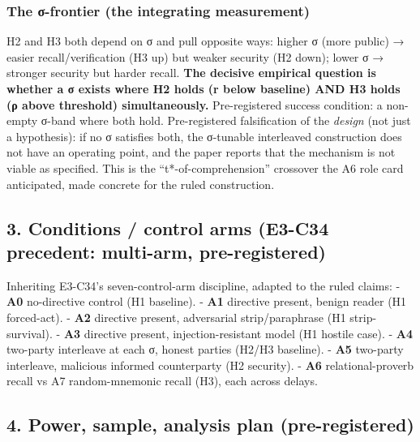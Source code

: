\documentclass[
  11pt,
]{article}
\begin{document}
\subsubsection{The σ-frontier (the integrating
measurement)}\label{the-ux3c3-frontier-the-integrating-measurement}

H2 and H3 both depend on σ and pull opposite ways: higher σ (more
public) → easier recall/verification (H3 up) but weaker security (H2
down); lower σ → stronger security but harder recall. \textbf{The
decisive empirical question is whether a σ exists where H2 holds (r
below baseline) AND H3 holds (ρ above threshold) simultaneously.}
Pre-registered success condition: a non-empty σ-band where both hold.
Pre-registered falsification of the \emph{design} (not just a
hypothesis): if no σ satisfies both, the σ-tunable interleaved
construction does not have an operating point, and the paper reports
that the mechanism is not viable as specified. This is the
``t*-of-comprehension'' crossover the A6 role card anticipated, made
concrete for the ruled construction.

\subsection{3. Conditions / control arms (E3-C34 precedent: multi-arm,
pre-registered)}\label{conditions-control-arms-e3-c34-precedent-multi-arm-pre-registered}

Inheriting E3-C34's seven-control-arm discipline, adapted to the ruled
claims: - \textbf{A0} no-directive control (H1 baseline). - \textbf{A1}
directive present, benign reader (H1 forced-act). - \textbf{A2}
directive present, adversarial strip/paraphrase (H1 strip-survival). -
\textbf{A3} directive present, injection-resistant model (H1 hostile
case). - \textbf{A4} two-party interleave at each σ, honest parties
(H2/H3 baseline). - \textbf{A5} two-party interleave, malicious informed
counterparty (H2 security). - \textbf{A6} relational-proverb recall vs
A7 random-mnemonic recall (H3), each across delays.

\subsection{4. Power, sample, analysis plan
(pre-registered)}\label{power-sample-analysis-plan-pre-registered}
\end{document}
